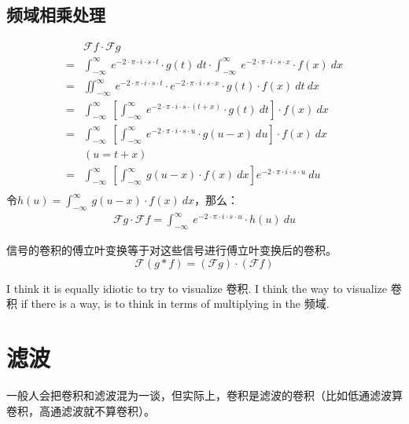 \subsection{频域相乘处理}
\begin{align*}
	  & \mathcal{F}f\cdot \mathcal{F}g                                                                                                                               \\
	= & \int_{-\infty}^{\infty}\ e^{-2\cdot \pi\cdot i\cdot s\cdot t}\cdot g(t)\ dt\cdot \int_{-\infty}^{\infty}\ e^{-2\cdot \pi\cdot i\cdot s\cdot x}\cdot f(x)\ dx \\
	= & \iint_{-\infty}^{\infty}\ e^{-2\cdot \pi\cdot i\cdot s\cdot t}\cdot e^{-2\cdot \pi\cdot i\cdot s\cdot x}\cdot g(t)\cdot f(x)\ dt\ dx                         \\
	= & \int_{-\infty}^{\infty}\ [\int_{-\infty}^{\infty}\ e^{-2\cdot \pi\cdot i\cdot s\cdot (t+x)}\cdot g(t)\ dt]\cdot f(x)\ dx                                     \\
	= & \int_{-\infty}^{\infty}\ [\int_{-\infty}^{\infty}\ e^{-2\cdot \pi\cdot i\cdot s\cdot u}\cdot g(u-x)\ du]\cdot f(x)\ dx                                       \\
	  & (u=t+x)                                                                                                                                                      \\
	= & \int_{-\infty}^{\infty}\ [\int_{-\infty}^{\infty}\ g(u-x)\cdot f(x)\ dx]e^{-2\cdot \pi\cdot i\cdot s\cdot u}\ du                                             \\
\end{align*}
令$h(u)=\int_{-\infty}^{\infty}\ g(u-x)\cdot f(x)\ dx$，那么：
\begin{align*}
	\mathcal{F}g\cdot \mathcal{F}f=\int_{-\infty}^{\infty}\ e^{-2\cdot \pi\cdot i\cdot s\cdot u}\cdot h(u)\ du
\end{align*}

信号的卷积的傅立叶变换等于对这些信号进行傅立叶变换后的卷积。
\begin{equation}
	\mathcal{F}(g*f)=(\mathcal{F}g)\cdot(\mathcal{F}f)
\end{equation}

I think it is equally idiotic to try to visualize 卷积. I think the way to visualize 卷积 if there is a way, is to think in terms of multiplying in the 频域.
\section{滤波}
一般人会把卷积和滤波混为一谈，但实际上，卷积是滤波的卷积（比如低通滤波算卷积，高通滤波就不算卷积）。
